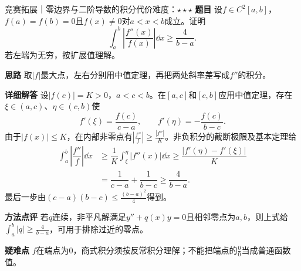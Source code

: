 \begin{example}{竞赛拓展｜零边界与二阶导数的积分代价}{难度：$\star\star\star$}\label{ci:ex:lyapunov}
\textbf{题目} 设$f\in C^2[a,b]$，$f(a)=f(b)=0$且$f(x)\ne0$对$a<x<b$成立。证明
\[
 \int_a^b\left|\dfrac{f''(x)}{f(x)}\right|\dd x\ge\dfrac4{b-a}.
\]
若左端为无穷，按扩展值理解。\par
\textbf{思路} 取$|f|$最大点，左右分别用中值定理，再把两处斜率差写成$f''$的积分。\par
\textbf{详细解答} 设$|f(c)|=K>0$，$a<c<b$。在$[a,c]$和$[c,b]$应用中值定理，存在$\xi\in(a,c)$、$\eta\in(c,b)$使
\[
 f'(\xi)=\dfrac{f(c)}{c-a},\qquad f'(\eta)=-\dfrac{f(c)}{b-c}.
\]
由于$|f(x)|\le K$，在内部非零点有$|\frac{f''}{f}|\ge\frac{|f''|}{K}$。非负积分的截断极限及基本定理给
\begin{align*}
 \int_a^b\left|\dfrac{f''}{f}\right|\dd x
 &\ge\dfrac1K\int_\xi^\eta|f''(x)|\dd x
 \ge\dfrac{|f'(\eta)-f'(\xi)|}K\\
 &=\dfrac1{c-a}+\dfrac1{b-c}
 \ge\dfrac4{b-a}.
\end{align*}
最后一步由$(c-a)(b-c)\le\frac{(b-a)^2}{4}$得到。\par
\textbf{方法点评} 若$q$连续，非平凡解满足$y''+q(x)y=0$且相邻零点为$a,b$，则上式给$\int_a^b|q|\ge\frac{4}{b-a}$，可用于排除过近的零点。\par
\textbf{疑难点} $f$在端点为0，商式积分须按反常积分理解；不能把端点的$\frac{0}{0}$当成普通函数值。
\end{example}

